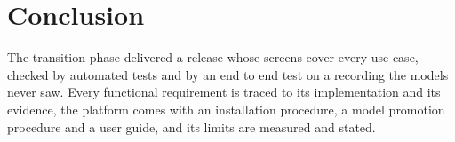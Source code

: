 \section*{Conclusion}

The transition phase delivered a release whose screens cover every use case, checked by automated tests and by an end to end test on a recording the models never saw. Every functional requirement is traced to its implementation and its evidence, the platform comes with an installation procedure, a model promotion procedure and a user guide, and its limits are measured and stated.
